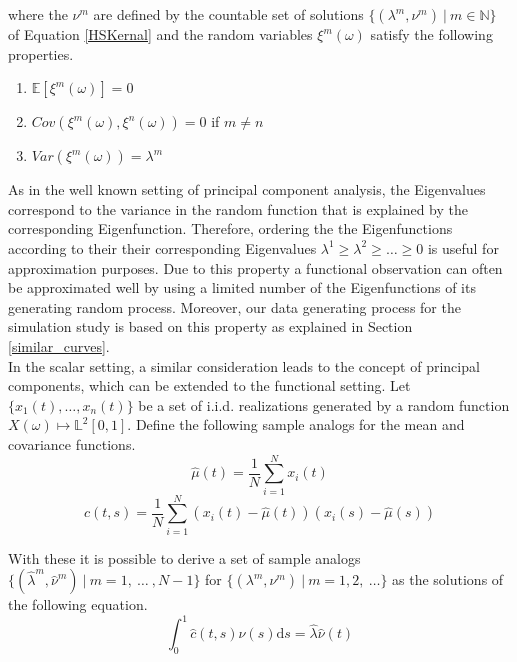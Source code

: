 \documentclass[11pt,twoside,a4paper]{article}
\begin{document}
	where the $\nu^m$ are defined by the countable set of solutions $\{(\lambda^m, \nu^m) \: \vert \: m \in \mathbb{N}\}$ of Equation \ref{HSKernal} and the random variables $\xi^{m}(\omega)$ satisfy the following properties.
	\begin{multicols}{2}
		\begin{enumerate}
			\item $\mathbb{E}\left[\xi^m(\omega)\right] = 0$
			\item $Cov\left(\xi^m(\omega), \xi^n(\omega)\right) = 0$ if $m \neq n$
			\item $Var\left(\xi^m(\omega)\right) = \lambda^m$
		\end{enumerate}
	\end{multicols}

	As in the well known setting of principal component analysis, the Eigenvalues correspond to the variance in the random function that is explained by the corresponding Eigenfunction. 
	Therefore, ordering the the Eigenfunctions according to their their corresponding Eigenvalues $\lambda^{1} \geq \lambda^{2} \geq \dots \geq 0$ is useful for approximation purposes. Due to this property a functional observation can often be approximated well by using a limited number of the Eigenfunctions of its generating random process. Moreover, our data generating process for the simulation study is based on this property as explained in Section \ref{similar_curves}.\\
	
	In the scalar setting, a similar consideration leads to the concept of principal components, which can be extended to the functional setting. Let $\{x_1(t), \dots, x_n(t)\}$ be a set of i.i.d. realizations generated by a random function $X(\omega) \mapsto \mathbb{L}^2[0,1]$.
	Define the following sample analogs for the mean and covariance functions.
	\begin{equation}
		\hat{\mu}(t) = \frac{1}{N}\sum_{i = 1}^{N}x_i(t)
	\end{equation}
	\begin{equation}
		\hat{c}(t,s) = \frac{1}{N} \sum_{i = 1}^{N} \left(x_i(t) - \hat{\mu}(t)\right) \left(x_i(s) - \hat{\mu}(s)\right)
	\end{equation}
	
	With these it is possible to derive a set of sample analogs $\{(\hat{\lambda}^m, \hat{\nu}^m) \: \vert \: m = 1,\: \dots\:, N-1\}$ for $\{(\lambda^m, \nu^m) \: \vert \: m = 1, 2, \:\dots\}$ as the solutions of the following equation. 
	\begin{equation}
		\int_{0}^{1}\hat{c}(t,s)\hat{\nu}(s) \mathrm{d}s = \hat{\lambda} \hat{\nu}(t)
	\end{equation}
\end{document}
